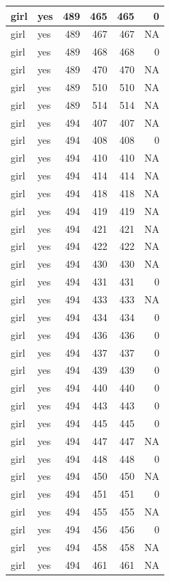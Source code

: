\documentclass[man]{apa6}
\begin{document}
\begin{tabular}{l|l|r|r|r|r}
\hline
girl & yes & 489 & 465 & 465 & 0\\
\hline
girl & yes & 489 & 467 & 467 & NA\\
\hline
girl & yes & 489 & 468 & 468 & 0\\
\hline
girl & yes & 489 & 470 & 470 & NA\\
\hline
girl & yes & 489 & 510 & 510 & NA\\
\hline
girl & yes & 489 & 514 & 514 & NA\\
\hline
girl & yes & 494 & 407 & 407 & NA\\
\hline
girl & yes & 494 & 408 & 408 & 0\\
\hline
girl & yes & 494 & 410 & 410 & NA\\
\hline
girl & yes & 494 & 414 & 414 & NA\\
\hline
girl & yes & 494 & 418 & 418 & NA\\
\hline
girl & yes & 494 & 419 & 419 & NA\\
\hline
girl & yes & 494 & 421 & 421 & NA\\
\hline
girl & yes & 494 & 422 & 422 & NA\\
\hline
girl & yes & 494 & 430 & 430 & NA\\
\hline
girl & yes & 494 & 431 & 431 & 0\\
\hline
girl & yes & 494 & 433 & 433 & NA\\
\hline
girl & yes & 494 & 434 & 434 & 0\\
\hline
girl & yes & 494 & 436 & 436 & 0\\
\hline
girl & yes & 494 & 437 & 437 & 0\\
\hline
girl & yes & 494 & 439 & 439 & 0\\
\hline
girl & yes & 494 & 440 & 440 & 0\\
\hline
girl & yes & 494 & 443 & 443 & 0\\
\hline
girl & yes & 494 & 445 & 445 & 0\\
\hline
girl & yes & 494 & 447 & 447 & NA\\
\hline
girl & yes & 494 & 448 & 448 & 0\\
\hline
girl & yes & 494 & 450 & 450 & NA\\
\hline
girl & yes & 494 & 451 & 451 & 0\\
\hline
girl & yes & 494 & 455 & 455 & NA\\
\hline
girl & yes & 494 & 456 & 456 & 0\\
\hline
girl & yes & 494 & 458 & 458 & NA\\
\hline
girl & yes & 494 & 461 & 461 & NA\\

\end{tabular}
\end{document}
